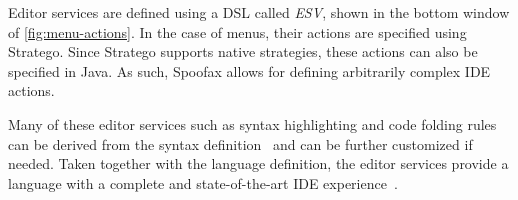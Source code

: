 Editor services are defined using a DSL called \textit{ESV}, shown in the bottom
window of \cref{fig:menu-actions}. In the case of menus, their actions are
specified using Stratego. Since Stratego supports native strategies, these
actions can also be specified in Java. As such, Spoofax allows for defining
arbitrarily complex IDE actions.

Many of these editor services such as syntax highlighting and code
folding rules can be derived from the syntax
definition~\cite{Kats10c} and can be further customized if
needed. Taken together with the language definition, the editor
services provide a language with a complete and state-of-the-art IDE
experience~\cite{Kats10a}.
